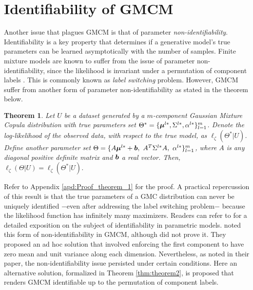 \documentclass{article}
\theoremstyle{plain}
\newtheorem{theorem}{Theorem}[section]
\theoremstyle{definition}
\theoremstyle{remark}
\begin{document}
\section{Identifiability of GMCM}\label{sec:identifiability_GMCM}
Another issue that plagues GMCM is that of parameter \emph{non-identifiability}. Identifiability is a key property that determines if a generative model's true parameters can be learned asymptotically with the number of samples. Finite mixture models are known to suffer from the issue of parameter non-identifiability, since the likelihood is invariant under a permutation of component labels \citep[see][]{Stephens2000}. This is commonly known as \emph{label switching} problem. However, GMCM suffer from another form of parameter non-identifiability as stated in the theorem below.

\begin{theorem}
\label{thm:theorem1}
 Let $U$ be a dataset generated by a $m$-component Gaussian Mixture Copula distribution with true parameters set $\Theta^* = \{\boldsymbol{\mu}^{l*}, \Sigma^{l*}, \alpha^{l*}\}_{l=1}^m$. Denote the log-likelihood of the observed data, with respect to the true model, as $\ell_\zeta(\Theta^*|U)$. Define another parameter set $\Theta= \{A\bs{\mu}^{l*}+\bs{b}, \ A^T\Sigma^{l*}A, \ \alpha^{l*}\}_{l=1}^m$, where $A$ is any diagonal positive definite matrix and $\boldsymbol{b}$ a real vector. Then, $\ell_\zeta(\Theta|U) = \ell_\zeta(\Theta^*|U)$.
\end{theorem}
Refer to Appendix \ref{apd:Proof_theorem_1} for the proof. A practical repercussion of this result is that the true parameters of a GMC distribution can never be uniquely identified $-$even after addressing the label switching problem$-$ because the likelihood function has infinitely many maximizers. Readers can refer to \citet{White1982} for a detailed exposition on the subject of identifiability in parametric models. \citet{Bilgrau2016} noted this form of non-identifiability in GMCM, although did not prove it. They proposed an ad hoc solution that involved enforcing the first component to have zero mean and unit variance along each dimension. Nevertheless, as noted in their paper, the non-identifiability issue persisted under certain conditions. Here an alternative solution, formalized in Theorem \ref{thm:theorem2}, is proposed that renders GMCM identifiable up to the permutation of component labels.
\end{document}
